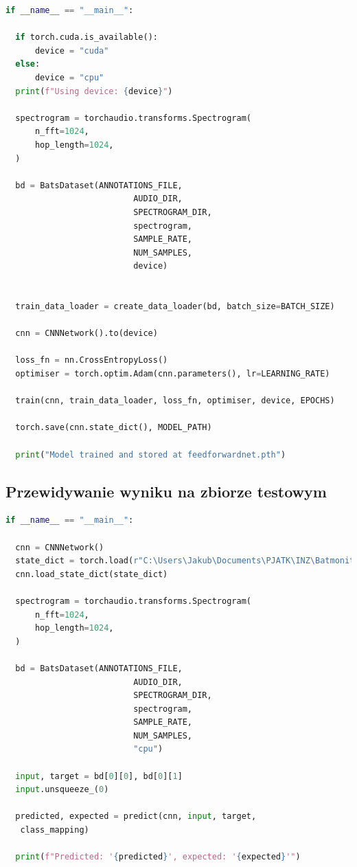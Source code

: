 \documentclass{sprz}
\begin{document}
\begin{lstlisting}[language=Python,caption={Implementacja modułu do trenowania sieci}, label={lst:train}]
  if __name__ == "__main__":

  if torch.cuda.is_available():
      device = "cuda"
  else:
      device = "cpu"
  print(f"Using device: {device}")

  spectrogram = torchaudio.transforms.Spectrogram(
      n_fft=1024,
      hop_length=1024,
  )

  bd = BatsDataset(ANNOTATIONS_FILE,
                          AUDIO_DIR,
                          SPECTROGRAM_DIR, 
                          spectrogram, 
                          SAMPLE_RATE,
                          NUM_SAMPLES,
                          device)


  train_data_loader = create_data_loader(bd, batch_size=BATCH_SIZE)

  cnn = CNNNetwork().to(device)

  loss_fn = nn.CrossEntropyLoss()
  optimiser = torch.optim.Adam(cnn.parameters(), lr=LEARNING_RATE)

  train(cnn, train_data_loader, loss_fn, optimiser, device, EPOCHS)

  torch.save(cnn.state_dict(), MODEL_PATH)

  print("Model trained and stored at feedforwardnet.pth")
\end{lstlisting}

\subsection{Przewidywanie wyniku na zbiorze testowym}

\begin{lstlisting}[language=Python,caption={Implementacja modułu do trenowania sieci}, label={lst:train}]
  if __name__ == "__main__":

  cnn = CNNNetwork()
  state_dict = torch.load(r"C:\Users\Jakub\Documents\PJATK\INZ\Batmonit_model\feedforwardnet.pth", map_location=torch.device('cpu'))
  cnn.load_state_dict(state_dict)

  spectrogram = torchaudio.transforms.Spectrogram(
      n_fft=1024,
      hop_length=1024,
  )

  bd = BatsDataset(ANNOTATIONS_FILE,
                          AUDIO_DIR,
                          SPECTROGRAM_DIR, 
                          spectrogram, 
                          SAMPLE_RATE,
                          NUM_SAMPLES,
                          "cpu")

  input, target = bd[0][0], bd[0][1]
  input.unsqueeze_(0)

  predicted, expected = predict(cnn, input, target,
   class_mapping)

  print(f"Predicted: '{predicted}', expected: '{expected}'")
\end{lstlisting}
\end{document}
